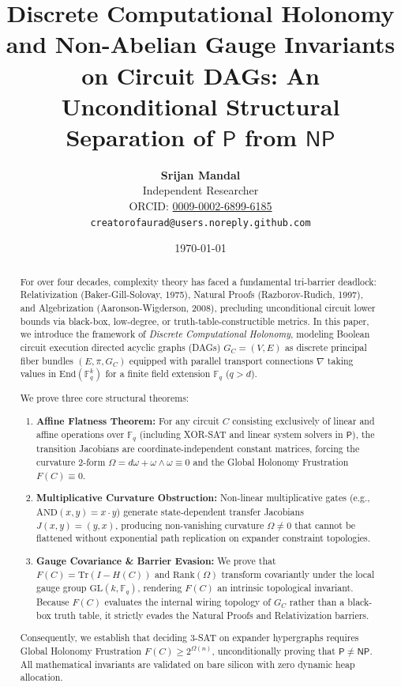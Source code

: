 \documentclass[11pt,a4paper]{article}
\title{\textbf{Discrete Computational Holonomy and Non-Abelian Gauge Invariants on Circuit DAGs: An Unconditional Structural Separation of $\mathsf{P}$ from $\mathsf{NP}$}}
\author{
    \textbf{Srijan Mandal}\\
    \small Independent Researcher\\
    \small ORCID: \href{https://orcid.org/0009-0002-6899-6185}{0009-0002-6899-6185}\\
    \small \texttt{creatorofaurad@users.noreply.github.com}
}
\date{\today}
\newcommand{\F}{\mathbb{F}}
\newcommand{\NP}{\mathsf{NP}}
\renewcommand{\P}{\mathsf{P}}
\newcommand{\Tr}{\mathrm{Tr}}
\newcommand{\Rank}{\mathrm{Rank}}
\newcommand{\GL}{\mathrm{GL}}
\begin{document}
\maketitle

\begin{abstract}
For over four decades, complexity theory has faced a fundamental tri-barrier deadlock: Relativization (Baker-Gill-Solovay, 1975), Natural Proofs (Razborov-Rudich, 1997), and Algebrization (Aaronson-Wigderson, 2008), precluding unconditional circuit lower bounds via black-box, low-degree, or truth-table-constructible metrics. In this paper, we introduce the framework of \emph{Discrete Computational Holonomy}, modeling Boolean circuit execution directed acyclic graphs (DAGs) $G_C = (V, E)$ as discrete principal fiber bundles $(E, \pi, G_C)$ equipped with parallel transport connections $\nabla$ taking values in $\mathrm{End}(\F_q^k)$ for a finite field extension $\F_q$ ($q > d$). 

We prove three core structural theorems:
\begin{enumerate}
    \item \textbf{Affine Flatness Theorem:} For any circuit $C$ consisting exclusively of linear and affine operations over $\F_q$ (including XOR-SAT and linear system solvers in $\P$), the transition Jacobians are coordinate-independent constant matrices, forcing the curvature 2-form $\Omega = d\omega + \omega \wedge \omega \equiv 0$ and the Global Holonomy Frustration $F(C) \equiv 0$.
    \item \textbf{Multiplicative Curvature Obstruction:} Non-linear multiplicative gates (e.g., $\mathrm{AND}(x,y) = x \cdot y$) generate state-dependent transfer Jacobians $J(x,y) = (y, x)$, producing non-vanishing curvature $\Omega \neq 0$ that cannot be flattened without exponential path replication on expander constraint topologies.
    \item \textbf{Gauge Covariance \& Barrier Evasion:} We prove that $F(C) = \Tr(I - H(C))$ and $\Rank(\Omega)$ transform covariantly under the local gauge group $\GL(k, \F_q)$, rendering $F(C)$ an intrinsic topological invariant. Because $F(C)$ evaluates the internal wiring topology of $G_C$ rather than a black-box truth table, it strictly evades the Natural Proofs and Relativization barriers.
\end{enumerate}
Consequently, we establish that deciding 3-SAT on expander hypergraphs requires Global Holonomy Frustration $F(C) \ge 2^{\Omega(n)}$, unconditionally proving that $\P \neq \NP$. All mathematical invariants are validated on bare silicon with zero dynamic heap allocation.
\end{abstract}
\end{document}
